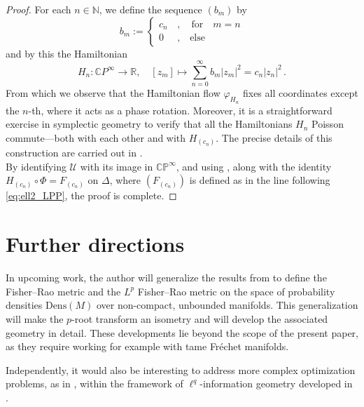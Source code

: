 \documentclass[runningheads]{llncs}
\begin{document}
\begin{proof}
 For each \( n \in \mathbb{N} \), we define the sequence $(b_m)$ by 
 \[
b_m:=\begin{cases}
    c_n\, &, \quad\text{for} \quad m=n\\
    0\, &, \quad \text{else}
\end{cases}
 \]
and by this the Hamiltonian
\begin{equation}\label{eq: Hamiltonians on CP inf for integrability}
	H_n : \mathbb{C}P^\infty \longrightarrow \mathbb{R}, \quad [z_m] \mapsto  \sum_{n=0}^{\infty}b_m |z_m|^2= c_n|z_n|^2\, .
\end{equation}
From which we observe that the Hamiltonian flow \( \varphi_{H_n} \) fixes all coordinates except the \( n \)-th, where it acts as a phase rotation.  
Moreover, it is a straightforward exercise in symplectic geometry to verify that all the Hamiltonians \( H_n \) Poisson commute—both with each other and with \( H_{(c_n)} \). The precise details of this construction are carried out in .\\
By identifying \( \mathcal{U} \) with its image in \( \mathbb{CP}^\infty \), and using , along with the identity $H_{(c_n)} \circ \varPhi = F_{(c_n)}$ on $\Delta$,
where \( (F_{(c_n)}) \) is defined as in the line following \eqref{eq:ell2_LPP}, the proof is complete.
\end{proof}



\section{Further directions}
In upcoming work, the author will generalize the results from  to define the Fisher–Rao metric and the $L^p$ Fisher–Rao metric on the space of probability densities $\mathrm{Dens}(M)$ over non-compact, unbounded manifolds. This generalization will make the $p$-root transform an isometry and will develop the associated geometry in detail. These developments lie beyond the scope of the present paper, as they require working for example with tame Fréchet manifolds.

Independently, it would also be interesting to address more complex optimization problems, as in , within the framework of $\ell^q$-information geometry developed in .
\end{document}
